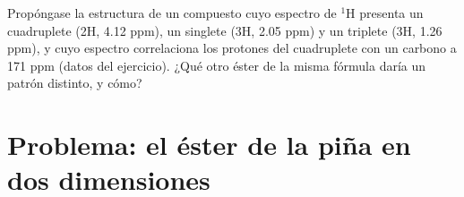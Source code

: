 \begin{exercise}[$\star\star\star$]\label{exo:b3:advanced-nmr:12}
Propóngase la estructura de un compuesto  cuyo espectro de ${}^1$H presenta un
cuadruplete (2H, 4.12 ppm), un singlete (3H, 2.05 ppm) y un triplete (3H,
1.26 ppm), y cuyo espectro  correlaciona los protones del cuadruplete con un
carbono a 171 ppm (datos del ejercicio). ¿Qué otro éster de la misma
fórmula daría un patrón  distinto, y cómo?
\end{exercise}

\section{Problema: el éster de la piña en dos dimensiones}

